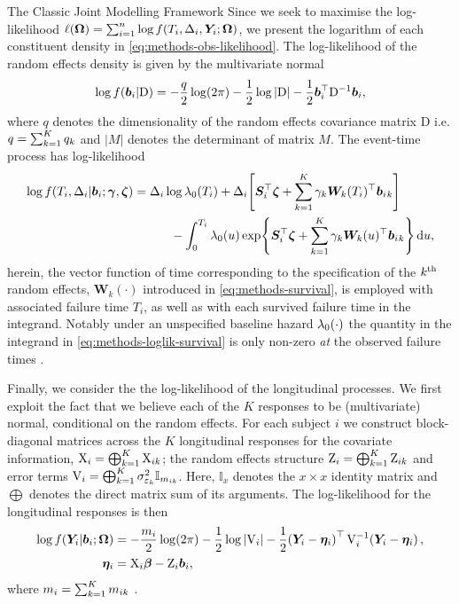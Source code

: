 \begin{chapter}{\label{cha:methods-classic}The Classic Joint Modelling Framework}
  Since we seek to maximise the log-likelihood $\ell(\bm{\mathrm{\Omega}})=\sum_{i=1}^n\log f\!\left( T_i, \Delta_i, \bm{Y}_i; \bm{\mathrm{\Omega}}\right)$, we present the logarithm of each constituent density in \eqref{eq:methods-obs-likelihood}. The log-likelihood of the random effects density is given by the multivariate normal 
  \begin{equation}
      \log f\!\left(\bm{b}_i|\mathrm{D}\right)=-\frac{q}{2}\log(2\pi)-\frac{1}{2}\log|\mathrm{D}|-\frac{1}{2}\bm{b}_i^\top\mathrm{D}^{-1}\bm{b}_i,
  \label{eq:methods-loglik-ranefs}
  \end{equation}
  where $q$ denotes the dimensionality of the random effects covariance matrix $\mathrm{D}$ i.e. $q=\sum_{k=1}^K q_k$ and $|M|$ denotes the determinant of matrix $M$. The event-time process has log-likelihood
  \begin{equation}
    \begin{aligned}
        \log f\!\left( T_i,\Delta_i|\bm{b}_i;\bm{\gamma},\bm{\zeta}\right) &= \Delta_i\log\lambda_0\!\left( T_i\right) + \Delta_i\!\left[\bm{S}_i^\top\bm{\zeta} + \sum_{k=1}^K\gamma_k\bm{W}_k(T_i)^\top\bm{b}_i{_k}\right] \\
        & \qquad \quad - \int_0^{T_i}\lambda_0\!\left( u\right)\exp\!\left\{\bm{S}_i^\top\bm{\zeta}+ \sum_{k=1}^K\gamma_k\bm{W}_k(u)^\top\bm{b}_i{_k}\right\} \mathrm{d}u,
    \end{aligned}
  \label{eq:methods-loglik-survival}
  \end{equation}
  herein, the vector function of time corresponding to the specification of the $k^{\text{th}}$ random effects, $\bm{W}_k(\cdot)$ introduced in \eqref{eq:methods-survival}, is employed with associated failure time $T_i$, as well as with each survived failure time in the integrand. Notably under an unspecified baseline hazard $\lambda_0\!\left(\cdot\right)$ the quantity in the integrand in \eqref{eq:methods-loglik-survival} is only non-zero \textit{at} the observed failure times \citep{Henderson2000}.
  
  Finally, we consider the the log-likelihood of the longitudinal processes. We first exploit the fact that we believe each of the $K$ responses to be (multivariate) normal, conditional on the random effects. For each subject $i$ we construct block-diagonal matrices across the $K$ longitudinal responses for the covariate information, $\mathrm{X}_i=\bigoplus_{k=1}^K\mathrm{X}_{ik}$; the random effects structure $\mathrm{Z}_i=\bigoplus_{k=1}^K\mathrm{Z}_{ik}$ and error terms $\mathrm{V}_i=\bigoplus_{k=1}^K\sigma^2_{\varepsilon_k}\mathbb{I}_{m_{ik}}$. Here, $\mathbb{I}_{x}$ denotes the $x\times x$ identity matrix and $\bigoplus$ denotes the direct matrix sum of its arguments. The log-likelihood for the longitudinal responses is then 
  \begin{align}\label{eq:methods-loglik-longit}
    \log f(\bm{Y}_i|\bm{b}_i;\bm{\mathrm{\Omega}}) &= -\frac{m_i}{2}\log(2\pi)-\frac{1}{2}\log|\mathrm{V}_i|-\frac{1}{2}\!\left(\bm{Y}_i-\bm{\eta}_i\right)^\top\mathrm{V}_i^{-1}\!\left(\bm{Y}_i-\bm{\eta}_i\right),\\
    \bm{\eta}_i &= \mathrm{X}_i\bm{\beta}-\mathrm{Z}_i\bm{b}_i, \nonumber
  \end{align}
  where $m_i=\sum_{k=1}^K m_{ik}$ .  
  

\end{chapter}
